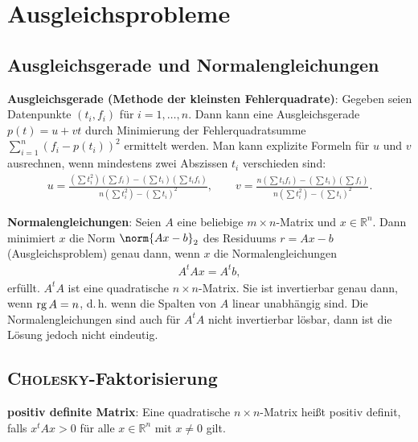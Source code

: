 \chapter{%
    Ausgleichsprobleme%
}

\section{%
    Ausgleichsgerade und Normalengleichungen%
}

\textbf{Ausgleichsgerade (Methode der kleinsten Fehlerquadrate)}:
Gegeben seien Datenpunkte $(t_i, f_i)$ für $i = 1, \dotsc, n$.
Dann kann eine Ausgleichsgerade $p(t) = u + vt$ durch Minimierung
der Fehlerquadratsumme
$\sum_{i=1}^n (f_i - p(t_i))^2$ ermittelt werden.
Man kann explizite Formeln für $u$ und $v$ ausrechnen,
wenn mindestens zwei Abszissen $t_i$ verschieden sind:
\begin{align*}
    u = \frac{(\sum t_i^2) (\sum f_i) - (\sum t_i) (\sum t_i f_i)}
    {n (\sum t_i^2) - (\sum t_i)^2}, \qquad
    v = \frac{n(\sum t_i f_i) - (\sum t_i) (\sum f_i)}
    {n (\sum t_i^2) - (\sum t_i)^2}.
\end{align*}

\linie

\textbf{Normalengleichungen}:
Seien $A$ eine beliebige $m \times n$-Matrix und $x \in \mathbb{R}^n$.
Dann minimiert $x$ die Norm $\norm{Ax - b}_2$ des Residuums $r = Ax - b$
(Ausgleichsproblem) genau dann, wenn $x$ die Normalengleichungen
\begin{align*}
    A^t Ax = A^t b,
\end{align*}
erfüllt.
$A^t A$ ist eine quadratische $n \times n$-Matrix.
Sie ist invertierbar genau dann, wenn $\operatorname{rg} A = n$, d.\,h. wenn die Spalten
von $A$ linear unabhängig sind.
Die Normalengleichungen sind auch für $A^t A$ nicht invertierbar lösbar,
dann ist die Lösung jedoch nicht eindeutig.

\section{%
    \textsc{Cholesky}-Faktorisierung%
}

\textbf{positiv definite Matrix}:
Eine quadratische $n \times n$-Matrix heißt positiv definit, falls
$x^t A x > 0$ für alle $x \in \mathbb{R}^n$ mit $x \not= 0$ gilt.

